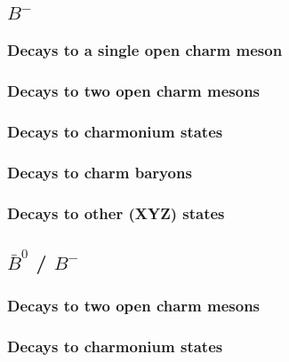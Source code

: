 \subsection{$B^-$}

\subsubsection{Decays to a single open charm meson}

\subsubsection{Decays to two open charm mesons}

\subsubsection{Decays to charmonium states}

\subsubsection{Decays to charm baryons}

\subsubsection{Decays to other (XYZ) states}


\subsection{$\bar{B}^0$ / $B^-$}

\subsubsection{Decays to two open charm mesons}

\subsubsection{Decays to charmonium states}

